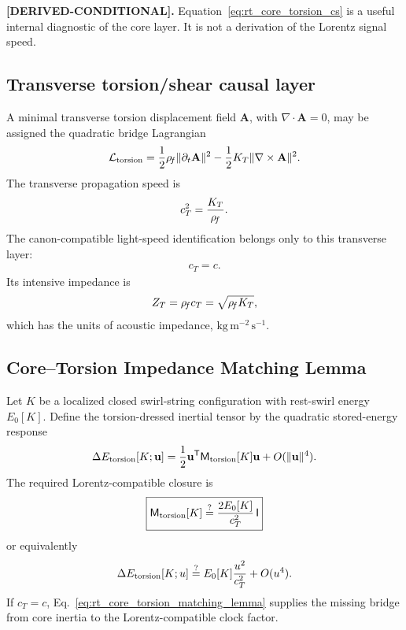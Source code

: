 \textbf{[DERIVED-CONDITIONAL].}
Equation~\eqref{eq:rt_core_torsion_cs} is a useful internal diagnostic of the core layer. It is not a derivation of the Lorentz signal speed.

\subsection{Transverse torsion/shear causal layer}

A minimal transverse torsion displacement field \(\mathbf A\), with \(\nabla\cdot\mathbf A=0\), may be assigned the quadratic bridge Lagrangian
\begin{align}
    \mathcal L_{\rm torsion}
    =
    \frac12\rho_{\!f}\lVert\partial_t\mathbf A\rVert^2
    -
    \frac12K_T\lVert\nabla\times\mathbf A\rVert^2 .
\end{align}
The transverse propagation speed is
\begin{align}
    c_T^2=\frac{K_T}{\rho_{\!f}}.
\end{align}
The canon-compatible light-speed identification belongs only to this transverse layer:
\begin{align}
    c_T=c.
\end{align}
Its intensive impedance is
\begin{align}
    Z_T=\rho_{\!f} c_T=\sqrt{\rho_{\!f} K_T},
\end{align}
which has the units of acoustic impedance, \(\mathrm{kg\,m^{-2}\,s^{-1}}\).

\subsection{Core--Torsion Impedance Matching Lemma}

Let \(K\) be a localized closed swirl-string configuration with rest-swirl energy \(E_0[K]\). Define the torsion-dressed inertial tensor by the quadratic stored-energy response
\begin{align}
    \Delta E_{\rm torsion}[K;\mathbf u]
    =
    \frac12\mathbf u^{\mathsf T}
    \mathsf M_{\rm torsion}[K]
    \mathbf u
    +O(\lVert\mathbf u\rVert^4).
\end{align}
The required Lorentz-compatible closure is
\begin{align}
    \boxed{
    \mathsf M_{\rm torsion}[K]
    \stackrel{?}{=}
    \frac{2E_0[K]}{c_T^2}\,\mathsf I
    }
    \label{eq:rt_core_torsion_matching_lemma}
\end{align}
or equivalently
\begin{align}
    \Delta E_{\rm torsion}[K;u]
    \stackrel{?}{=}
    E_0[K]\frac{u^2}{c_T^2}+O(u^4).
\end{align}
If \(c_T=c\), Eq.~\eqref{eq:rt_core_torsion_matching_lemma} supplies the missing bridge from core inertia to the Lorentz-compatible clock factor.

